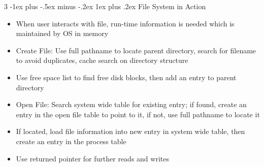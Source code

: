 \documentclass[10pt, landscape]{article}
\makeatletter
\renewcommand{\subsection}{\@startsection{subsection}{3}{0mm}%
                                {-1ex plus -.5ex minus -.2ex}%
                                {1ex plus .2ex}%
                                {\normalfont\small\bfseries}}%
\makeatother
\begin{document}
\begin{multicols*}{3}
\subsection{File System in Action}
\begin{itemize}
    \item When user interacts with file, run-time information is needed which is maintained by OS in memory
    \item Create File: Use full pathname to locate parent directory, search for filename to avoid duplicates, cache search on directory structure
    \item Use free space list to find free disk blocks, then add an entry to parent directory
    \item Open File: Search system wide table for existing entry; if found, create an entry in the open file table to point to it, if not, use full pathname to locate it
    \item If located, load file information into new entry in system wide table, then create an entry in the process table
    \item Use returned pointer for further reads and writes
\end{itemize}



\end{multicols*}
\end{document}
